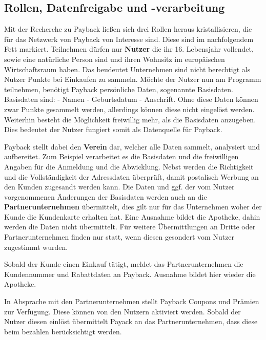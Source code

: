 \subsection{Rollen, Datenfreigabe und -verarbeitung}
Mit der Recherche zu Payback ließen sich drei Rollen heraus kristallisieren, die für das Netzwerk von Payback von Interesse sind. Diese sind im nachfolgendem Fett markiert.\newline
Teilnehmen dürfen nur \textbf{Nutzer} die ihr 16. Lebensjahr vollendet, sowie eine natürliche Person sind und ihren Wohnsitz im europäischen Wirtschaftsraum haben.\cite{Payback_Teilnahme} Das beudeutet Unternehmen sind nicht berechtigt als Nutzer Punkte bei Einkaufen zu sammeln. Möchte der Nutzer nun am Programm teilnehmen, benötigt Payback persönliche Daten, sogenannte Basisdaten. Basisdaten sind:\newline
- Namen\newline
- Geburtsdatum\newline
- Anschrift.\newline
 Ohne diese Daten können zwar Punkte gesammelt werden, allerdings können diese nicht eingelöst werden. Weiterhin besteht die Möglichkeit freiwillig mehr, als die Basisdaten anzugeben. Dies bedeutet der Nutzer fungiert somit als Datenquelle für Payback.

 Payback stellt dabei den \textbf{Verein} dar, welcher alle Daten sammelt, analysiert und aufbereitet. Zum Beispiel verarbeitet es die Basisdaten und die freiwilligen Angaben für die Anmeldung und die Abwicklung. Nebst werden die Richtigkeit und die Vollständigkeit der Adressdaten überprüft, damit postalisch Werbung an den Kunden zugesandt werden kann. Die Daten und ggf. der vom Nutzer vorgenommenen Änderungen der Basisdaten werden auch an die \textbf{Partnerunternehmen} übermittelt, dies gilt nur für das Unternehmen woher der Kunde die Kundenkarte erhalten hat. Eine Ausnahme bildet die Apotheke, dahin werden die Daten nicht übermittelt. Für weitere Übermittlungen an Dritte oder Partnerunternehmen finden nur statt, wenn diesen gesondert vom Nutzer zugestimmt wurden. 

Sobald der Kunde einen Einkauf tätigt, meldet das Partnerunternehmen die Kundennummer und Rabattdaten an Payback.  Ausnahme bildet hier wieder die Apotheke. \newline

\noindent In Absprache mit den Partnerunternehmen stellt Payback Coupons und Prämien zur Verfügung. Diese können von den Nutzern aktiviert werden. Sobald der Nutzer diesen einlöst übermittelt Payack an das Partnerunternehmen, dass diese beim bezahlen berücksichtigt werden.

